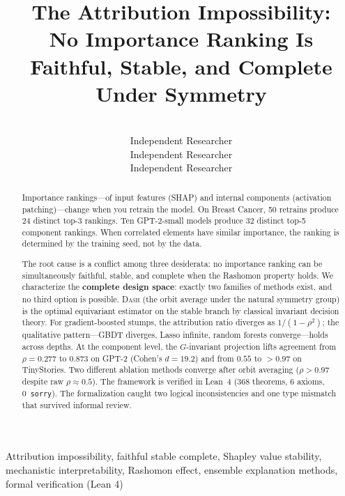 \documentclass{jmlr}
\title[The Attribution Impossibility]{The Attribution Impossibility:\\{\large No Importance Ranking Is Faithful, Stable, and Complete Under Symmetry}}
\author{\Name{Drake Caraker} \Email{drakecaraker@gmail.com}\\
  \addr Independent Researcher
  \AND
  \Name{Bryan Arnold} \Email{puremath86@gmail.com}\\
  \addr Independent Researcher
  \AND
  \Name{David Rhoads} \Email{drhoads9@gmail.com}\\
  \addr Independent Researcher
}
\newcommand{\DASH}{\textsc{Dash}}
\begin{document}
\maketitle


\begin{abstract}
Importance rankings---of input features (SHAP) and internal components (activation patching)---change when you retrain the model. On Breast Cancer, 50 retrains produce 24 distinct top-3 rankings. Ten GPT-2-small models produce 32 distinct top-5 component rankings. When correlated elements have similar importance, the ranking is determined by the training seed, not by the data.

The root cause is a conflict among three desiderata: no importance ranking can be simultaneously faithful, stable, and complete when the Rashomon property holds. We characterize the \textbf{complete design space}: exactly two families of methods exist, and no third option is possible. \DASH{} (the orbit average under the natural symmetry group) is the optimal equivariant estimator on the stable branch by classical invariant decision theory. For gradient-boosted stumps, the attribution ratio diverges as $1/(1{-}\rho^2)$; the qualitative pattern---GBDT diverges, Lasso infinite, random forests converge---holds across depths. At the component level, the $G$-invariant projection lifts agreement from $\rho = 0.277$ to $0.873$ on GPT-2 (Cohen's $d = 19.2$) and from $0.55$ to $> 0.97$ on TinyStories. Two different ablation methods converge after orbit averaging ($\rho > 0.97$ despite raw $\rho \approx 0.5$). The framework is verified in Lean~4 (368 theorems, 6 axioms, 0~\texttt{sorry}). The formalization caught two logical inconsistencies and one type mismatch that survived informal review.
\end{abstract}

\begin{keywords}
Attribution impossibility, faithful stable complete, Shapley value stability, mechanistic interpretability, Rashomon effect, ensemble explanation methods, formal verification (Lean 4)
\end{keywords}
\end{document}
